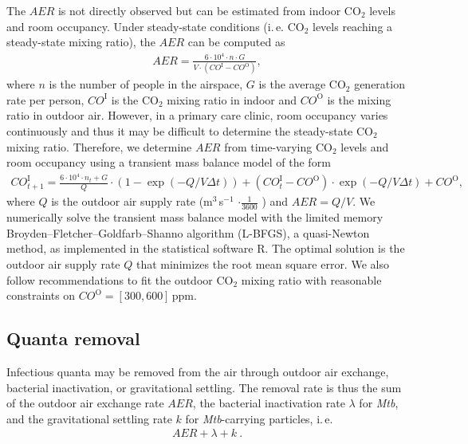 \documentclass[fleqn,11pt]{wlscirep_supp}
\newcommand\ie{i.\,e.\xspace}
\begin{document}
The $AER$ is not directly observed but can be estimated from indoor CO$_2$ levels and room occupancy. Under steady-state conditions (\ie CO$_2$ levels reaching a steady-state mixing ratio), the $AER$ can be computed as
\begin{align}
    AER = \frac{6\cdot10^4 \cdot n \cdot G}{V\cdot(CO^{\text{I}}-CO^{\text{O}})},
\end{align}
where $n$ is the number of people in the airspace, $G$ is the average CO$_2$ generation rate per person, $CO^{\text{I}}$ is the CO$_2$ mixing ratio in indoor and $CO^{\text{O}}$ is the mixing ratio in outdoor air\cite{Batterman2017IJERPH}. However, in a primary care clinic, room occupancy varies continuously and thus it may be difficult to determine the steady-state CO$_2$ mixing ratio. Therefore, we determine $AER$ from time-varying CO$_2$ levels and room occupancy using a transient mass balance model of the form\cite{Batterman2017IJERPH}
\begin{align}
    CO_{t+1}^{\text{I}} = \frac{6\cdot10^4 \cdot n_t + G}{Q} \cdot \left(1 - \exp(-Q/V \Delta t)\right) + (CO_t^{\text{I}}-CO^{\text{O}}) \cdot \exp(-Q/V \Delta t) + CO^{\text{O}},
\end{align}
where $Q$ is the outdoor air supply rate (m$^3$\,s$^{-1}$ $\cdot \frac{1}{3600}$ ) and $AER = Q/V$. We numerically solve the transient mass balance model with the limited memory Broyden–Fletcher–Goldfarb–Shanno algorithm (L-BFGS), a quasi-Newton method, as implemented in the statistical software R\cite{Byrd1995SIAM}. The optimal solution is the outdoor air supply rate $Q$ that minimizes the root mean square error. We also follow recommendations to fit the outdoor CO$_2$ mixing ratio with reasonable constraints on $CO^{\text{O}} = [300,600]$\,ppm\cite{Batterman2017IJERPH}. 

\subsection{Quanta removal}\label{sec:quanta-removal}

Infectious quanta may be removed from the air through outdoor air exchange, bacterial inactivation, or gravitational settling. The removal rate is thus the sum of the outdoor air exchange rate $AER$, the bacterial inactivation rate $\lambda$ for \emph{Mtb}, and the gravitational settling rate $k$ for \emph{Mtb}-carrying particles, \ie 
\begin{align}\label{eq:removal}
    AER + \lambda + k~.
\end{align}
\end{document}
